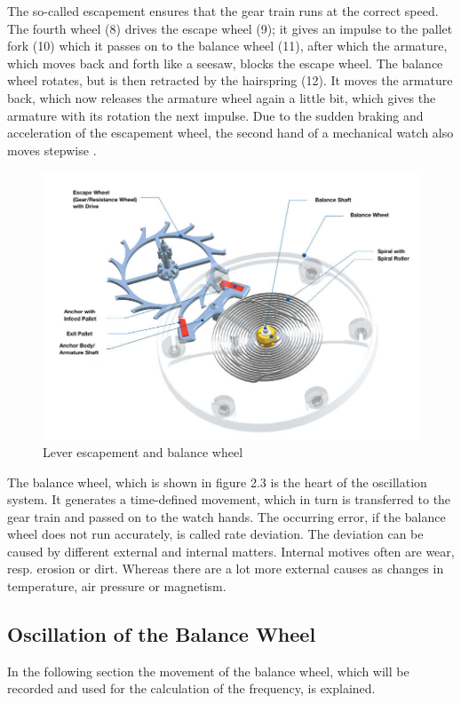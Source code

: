 \documentclass[12pt, a4paper]{report}
\begin{document}
The so-called escapement ensures that the gear train runs at the correct speed. The fourth wheel (8) drives the escape wheel (9); it gives an impulse to the pallet fork (10) which it passes on to the balance wheel (11), after which the armature, which moves back and forth like a seesaw, blocks the escape wheel. The balance wheel rotates, but is then retracted by the hairspring (12). It moves the armature back, which now releases the armature wheel again a little bit, which gives the armature with its rotation the next impulse. Due to the sudden braking and acceleration of the escapement wheel, the second hand of a mechanical watch also moves stepwise \cite{Uhrwerk}.
    \newline
    \noindent
    \begin{figure}[H]
    \centering
    \includegraphics[scale=0.45]{Images/Hemmung-Teil1.jpg}
    
    \caption{Lever escapement and balance wheel \cite{Uhrwerk}}
    \end{figure}
\bigskip
The balance wheel, which is shown in figure 2.3 is the heart of the oscillation system. It generates a time-defined movement, which in turn is transferred to the gear train and passed on to the watch hands. 
The occurring error, if the balance wheel does not run accurately, is called rate deviation. The deviation can be caused by different external and internal matters. Internal motives often are wear, resp. erosion or dirt. Whereas there are a lot more external causes as changes in temperature, air pressure or magnetism.

\subsection{Oscillation of the Balance Wheel}
In the following section the movement of the balance wheel, which will be recorded and used for the calculation of the frequency, is explained.
\end{document}
